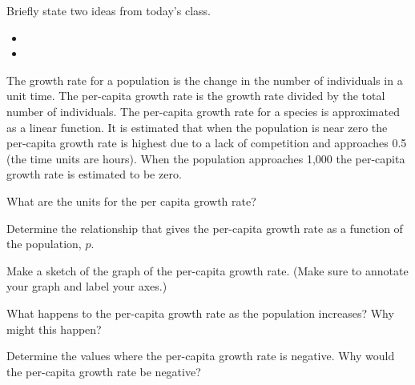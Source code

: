 \postClass

\begin{problem}
\item Briefly state two ideas from today's class.
  \begin{itemize}
  \item
  \item
  \end{itemize}
\item The growth rate for a population is the change in the number of individuals
  in a unit time. The per-capita growth rate is the growth rate divided by
  the total number of individuals.
  The per-capita growth rate for a species is approximated as a
  linear function. It is estimated that when the population is near
  zero the per-capita growth rate is highest due to a lack of
  competition and approaches 0.5 (the time units are hours). When the
  population approaches 1,000 the per-capita growth rate is estimated
  to be zero.
  \begin{subproblem}
    \item What are the units for the per capita growth rate?
    \item Determine the relationship that gives the per-capita growth
      rate as a function of the population, $p$.
    \item Make a sketch of the graph of the per-capita growth
      rate. (Make sure to annotate your graph and label your axes.)
    \item What happens to the per-capita growth rate as the population
      increases? Why might this happen?
    \item Determine the values where the per-capita growth rate is
      negative. Why would the per-capita growth rate be negative?
  \end{subproblem}
\end{problem}


